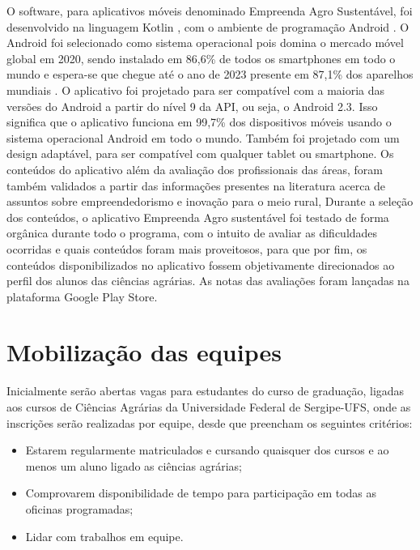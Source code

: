 O software, para aplicativos móveis denominado Empreenda Agro Sustentável, foi desenvolvido na linguagem Kotlin \cite{smyth_kotlinandroid_2017}, com o ambiente de programação Android \cite{android_conheco_2019}. O Android foi selecionado como sistema operacional pois domina o mercado móvel global em 2020, sendo instalado em 86,6\% de todos os smartphones em todo o mundo e espera-se que chegue até o ano de 2023 presente em 87,1\% dos aparelhos mundiais \cite{idc_idc_2020}. 
O aplicativo foi projetado para ser compatível com a maioria das versões do Android a partir do nível 9 da API, ou seja, o Android 2.3. Isso significa que o aplicativo funciona em 99,7\% dos dispositivos móveis usando o sistema operacional Android em todo o mundo. Também foi projetado com um design adaptável, para ser compatível com qualquer tablet ou smartphone. 
Os conteúdos do aplicativo além da avaliação dos profissionais das áreas, foram também validados a partir das informações presentes na literatura acerca de assuntos sobre empreendedorismo e inovação para o meio rural, \cite{melo_sebrae_2008, oliveira_perfil_2006}
Durante a seleção dos conteúdos, o aplicativo Empreenda Agro sustentável foi testado de forma orgânica durante todo o programa, com o intuito de avaliar as dificuldades ocorridas e quais conteúdos foram mais proveitosos, para que por fim, os conteúdos disponibilizados no aplicativo fossem objetivamente direcionados ao perfil dos alunos das ciências agrárias. As notas das avaliações foram lançadas na plataforma Google Play Store. 


\section{Mobilização das equipes}

Inicialmente serão abertas vagas para estudantes do curso de graduação, ligadas aos cursos de Ciências Agrárias da Universidade Federal de Sergipe-UFS, onde as inscrições serão realizadas por equipe, desde que preencham os seguintes critérios:

	
\begin{itemize}
\item{Estarem regularmente matriculados e cursando quaisquer dos cursos e ao menos um aluno ligado as ciências agrárias;}
\item{Comprovarem disponibilidade de tempo para participação em todas as oficinas programadas;}
\item{Lidar com trabalhos em equipe.}
\end{itemize}

